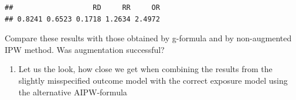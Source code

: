 \documentclass[
]{book}
\newenvironment{Shaded}{\begin{snugshade}}{\end{snugshade}}
\newcommand{\DecValTok}[1]{\textcolor[rgb]{0.00,0.00,0.81}{#1}}
\newcommand{\FunctionTok}[1]{\textcolor[rgb]{0.13,0.29,0.53}{\textbf{#1}}}
\newcommand{\NormalTok}[1]{#1}
\newcommand{\OtherTok}[1]{\textcolor[rgb]{0.56,0.35,0.01}{#1}}
\newcommand{\SpecialCharTok}[1]{\textcolor[rgb]{0.81,0.36,0.00}{\textbf{#1}}}
\providecommand{\tightlist}{%
  \setlength{\itemsep}{0pt}\setlength{\parskip}{0pt}}
\begin{document}
\begin{Shaded}
\end{Shaded}

\begin{verbatim}
##                   RD     RR     OR 
## 0.8241 0.6523 0.1718 1.2634 2.4972
\end{verbatim}

Compare these results with those obtained by g-formula and by
non-augmented IPW method. Was augmentation successful?

\begin{enumerate}
\def\labelenumi{\arabic{enumi}.}
\setcounter{enumi}{1}
\tightlist
\item
  Let us the look, how close we get when combining the results
  from the slightly misspecified outcome model with the correct
  exposure model using the alternative AIPW-formula
\end{enumerate}
\end{document}
